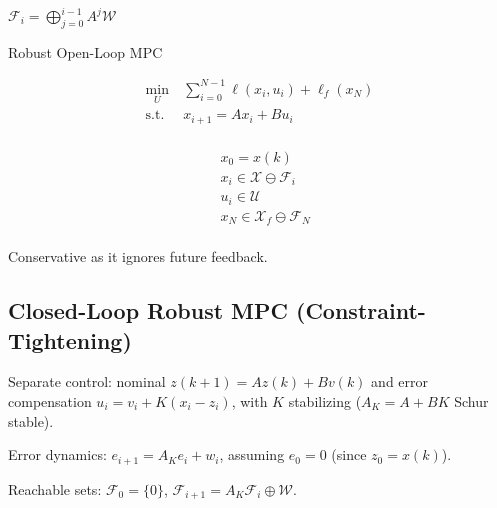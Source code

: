  \quad $\mathcal{F}_i =
\bigoplus_{j=0}^{i-1} A^j \mathcal{W}$

\begin{sstTitleBox}[RoyalBlue]{Robust Open-Loop MPC}
  \begin{sstOnlyFrame}
    \begin{minipage}[t]{0.55\linewidth}
      \[
        \begin{aligned}
          \min_U \      & \sum_{i=0}^{N-1} \ell(x_i, u_i) + \ell_f(x_N) \\
          \text{s.t.}\  & x_{i+1} = Ax_i + Bu_i                   \\
      \end{aligned}\]
    \end{minipage}
    \begin{minipage}[t]{0.4\linewidth}
      \[
        \begin{aligned}
          & x_0 = x(k)                                  \\
          & x_i \in \mathcal{X} \ominus \mathcal{F}_i   \\
          & u_i \in \mathcal{U}                         \\
          & x_N \in \mathcal{X}_f \ominus \mathcal{F}_N \\
      \end{aligned}\]
    \end{minipage}
  \end{sstOnlyFrame}
\end{sstTitleBox}

Conservative as it ignores future feedback.

\subsection{Closed-Loop Robust MPC (Constraint-Tightening)}

Separate control: nominal $z(k+1)=Az(k)+Bv(k)$ and error compensation
$u_i = v_i + K(x_i - z_i)$, with $K$ stabilizing ($A_K = A+BK$ Schur stable).

Error dynamics: $e_{i+1} = A_K e_i + w_i$, assuming $e_0 = 0$ (since
$z_0 = x(k)$).

Reachable sets: $\mathcal{F}_0 = \{0\}$, $\mathcal{F}_{i+1} = A_K
\mathcal{F}_i \oplus \mathcal{W}$.

